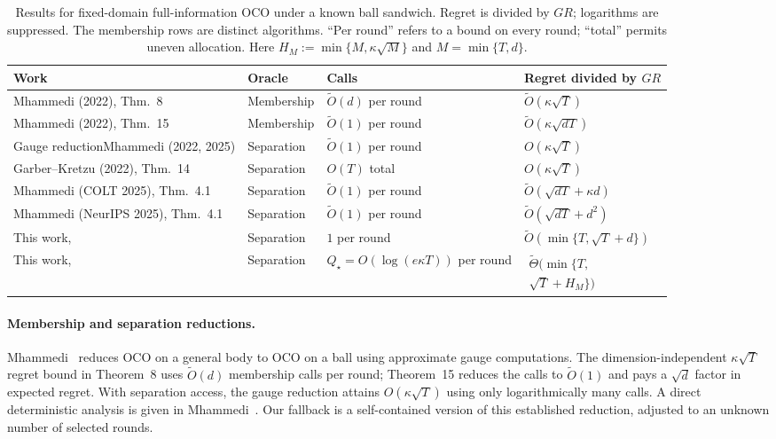 \documentclass[11pt]{article}
\newcommand{\wtO}{\widetilde O}
\newcommand{\wtTheta}{\widetilde\Theta}
\theoremstyle{definition}
\newcounter{algorithm}
\begin{document}
\begin{table}[t]
\centering
\caption{Results for fixed-domain full-information OCO under a known ball
sandwich. Regret is divided by $GR$; logarithms are suppressed. The
membership rows are distinct algorithms. ``Per round'' refers to a bound
on every round; ``total'' permits uneven allocation.
Here $H_M:=\min\{M,\kappa\sqrt M\}$ and $M=\min\{T,d\}$.}
\label{tab:related}
\small
\renewcommand{\arraystretch}{1.18}
\begin{tabularx}{\textwidth}{@{}P{0.28\textwidth}P{0.15\textwidth}P{0.24\textwidth}Y@{}}
\toprule
Work & Oracle & Calls & Regret divided by $GR$ \\
\midrule
Mhammedi (2022), Thm.~8 & Membership & $\wtO(d)$ per round & $\wtO(\kappa\sqrt T)$ \\
Mhammedi (2022), Thm.~15 & Membership & $\wtO(1)$ per round & $\wtO(\kappa\sqrt{dT})$ \\
Gauge reduction\newline Mhammedi (2022, 2025) & Separation & $\wtO(1)$ per round & $O(\kappa\sqrt T)$ \\
Garber--Kretzu (2022), Thm.~14 & Separation & $O(T)$ total & $O(\kappa\sqrt T)$ \\
Mhammedi (COLT 2025), Thm.~4.1 & Separation & $\wtO(1)$ per round & $\wtO(\sqrt{dT}+\kappa d)$ \\
Mhammedi (NeurIPS 2025), Thm.~4.1 & Separation & $\wtO(1)$ per round & $\wtO(\sqrt{dT}+d^2)$ \\
\midrule
This work,  & Separation & $1$ per round & $\wtO(\min\{T,\sqrt T+d\})$ \\
This work,  & Separation & $Q_\star=O(\log(e\kappa T))$ per round &
$\begin{gathered}\wtTheta(\min\{T,\\[-2pt]\sqrt T+H_M\})\end{gathered}$ \\
\bottomrule
\end{tabularx}
\end{table}

\paragraph{Membership and separation reductions.}
Mhammedi~\cite{mhammedi2022membership} reduces OCO on a general body to OCO
on a ball using approximate gauge computations. The dimension-independent
$\kappa\sqrt T$ regret bound in Theorem~8 uses $\wtO(d)$ membership calls
per round; Theorem~15 reduces the calls to $\wtO(1)$ and pays a $\sqrt d$
factor in expected regret. With separation access, the gauge reduction
attains $O(\kappa\sqrt T)$ using only logarithmically many calls. A direct
deterministic analysis is given in Mhammedi~\cite[Lemma~4.1 and
Remark~4.1]{mhammedi2025sep}. Our fallback is a self-contained version of
this established reduction, adjusted to an unknown number of selected rounds.
\end{document}
